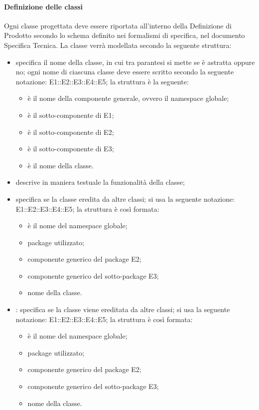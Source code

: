 \paragraph{Definizione delle classi}
\label{}
Ogni classe progettata deve essere riportata all'interno della Definizione di Prodotto secondo lo schema definito nei formalismi di specifica, nel documento Specifica Tecnica. La classe verrà modellata secondo la seguente struttura:
\begin{itemize}
\item {}specifica il nome della classe, in cui tra parantesi si mette se è astratta oppure no; ogni nome di ciascuna classe deve essere scritto secondo la seguente notazione: E1::E2::E3::E4::E5; la struttura è la seguente:
\begin{itemize}
\item {}è il nome della componente generale, ovvero il namespace globale;
\item {}è il sotto-componente di E1;
\item {}è il sotto-componente di E2;
\item {}è il sotto-componente di E3;
\item {}è il nome della classe.
\end{itemize}
\item {}descrive in maniera testuale la funzionalità della classe;
\item {}specifica se la classe eredita da altre classi; si usa la seguente notazione: E1::E2::E3::E4::E5; la struttura è così formata:
\begin{itemize}
\item {}è il nome del namespace globale;
\item {}package utilizzato;
\item {}componente generico del package E2;
\item {}componente generico del sotto-package E3;
\item {}nome della classe.
\end{itemize}
\item {}: specifica se la classe viene ereditata da altre classi; si usa la seguente notazione: E1::E2::E3::E4::E5; la struttura è così formata:
\begin{itemize}
\item {}è il nome del namespace globale;
\item {}package utilizzato;
\item {}componente generico del package E2;
\item {}componente generico del sotto-package E3;
\item {}nome della classe.
\end{itemize}
\end{itemize}

